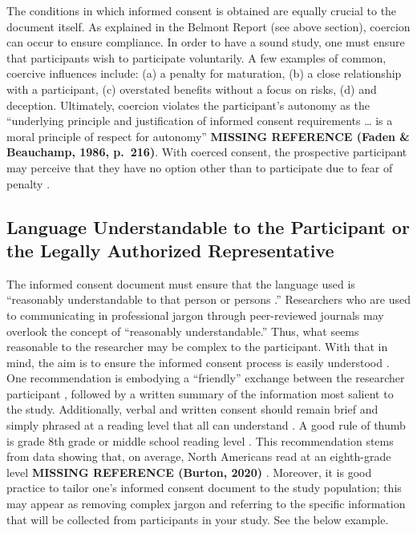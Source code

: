 \documentclass[
  11pt,
]{book}
\begin{document}
The conditions in which informed consent is obtained are equally crucial to the document itself. As explained in the Belmont Report (see above section), coercion can occur to ensure compliance. In order to have a sound study, one must ensure that participants wish to participate voluntarily. A few examples of common, coercive influences include: (a) a penalty for maturation, (b) a close relationship with a participant, (c) overstated benefits without a focus on risks, (d) and deception. Ultimately, coercion violates the participant's autonomy as the ``underlying principle and justification of informed consent requirements \ldots{} is a moral principle of respect for autonomy'' \textbf{MISSING REFERENCE (Faden \& Beauchamp, 1986, p.~216)}. With coerced consent, the prospective participant may perceive that they have no option other than to participate due to fear of penalty \citep{wendler_why_2017}.

\subsection{Language Understandable to the Participant or the Legally Authorized Representative}\label{language-understandable-to-the-participant-or-the-legally-authorized-representative}

The informed consent document must ensure that the language used is ``reasonably understandable to that person or persons \citep[Section 8.03]{american_psychological_association_ethical_2017}.'' Researchers who are used to communicating in professional jargon through peer-reviewed journals may overlook the concept of ``reasonably understandable.'' Thus, what seems reasonable to the researcher may be complex to the participant. With that in mind, the aim is to ensure the informed consent process is easily understood \citep{roache_why_2014}. One recommendation is embodying a ``friendly'' exchange between the researcher participant \citep[p.~435]{roache_why_2014}, followed by a written summary of the information most salient to the study. Additionally, verbal and written consent should remain brief and simply phrased at a reading level that all can understand \citep[p.~435]{roache_why_2014}. A good rule of thumb is grade 8th grade or middle school reading level \citep{foe_reading_2016, paasche-orlow_readability_2003}. This recommendation stems from data showing that, on average, North Americans read at an eighth-grade level \citep{noauthor_skills_nodate, taub_informed_1986} \textbf{MISSING REFERENCE (Burton, 2020)} . Moreover, it is good practice to tailor one's informed consent document to the study population; this may appear as removing complex jargon and referring to the specific information that will be collected from participants in your study. See the below example.
\end{document}
